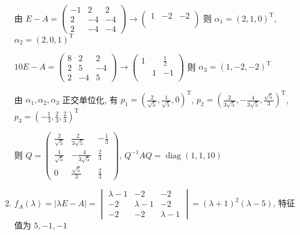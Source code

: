 \begin{enumerate}
			       由 \( E-A = \begin{pmatrix}
				       -1 & 2  & 2  \\
				       2  & -4 & -4 \\
				       2  & -4 & -4
			       \end{pmatrix} \rightarrow \begin{pmatrix}
				       1 & -2 & -2 \\
				         &    &    \\
				         &    &
			       \end{pmatrix} \) 则 \( \alpha_{1} = (2, 1, 0)^{\mathrm{T}} \), \( \alpha_{2} = (2, 0, 1)^{\mathrm{T}} \)

			       \( 10E-A = \begin{pmatrix}
				       8 & 2  & 2  \\
				       2 & 5  & -4 \\
				       2 & -4 & 5
			       \end{pmatrix} \rightarrow \begin{pmatrix}
				       1 &   & \frac{1}{2} \\
				         & 1 & -1          \\
				         &   &
			       \end{pmatrix} \) 则 \( \alpha_{3} = (1, -2, -2)^{\mathrm{T}} \)

			       由 \( \alpha_{1}, \alpha_{2}, \alpha_{3} \) 正交单位化, 有 \( p_{1} = \left( \frac{2}{\sqrt{5}}, \frac{1}{\sqrt{5}}, 0 \right)^{\mathrm{T}} \), \( p_{2} = \left( \frac{2}{3\sqrt{5}}, -\frac{4}{3\sqrt{5}}, \frac{\sqrt{5}}{3} \right)^{\mathrm{T}} \), \( p_{3} = \left( -\frac{1}{3}, \frac{2}{3}, \frac{2}{3} \right)^{\mathrm{T}} \)

			       则 \( Q = \begin{pmatrix}
				       \frac{2}{\sqrt{5}} & \frac{2}{3\sqrt{5}}  & -\frac{1}{3} \\
				       \frac{1}{\sqrt{5}} & -\frac{4}{3\sqrt{5}} & \frac{2}{3}  \\
				       0                  & \frac{\sqrt{5}}{3}   & \frac{2}{3}
			       \end{pmatrix} \), \( Q^{-1}AQ = \operatorname{diag}(1, 1, 10) \)
			 \item %
			       \( f_{A}(\lambda) = |\lambda E - A| = \begin{vmatrix}
				       \lambda-1 & -2        & -2        \\
				       -2        & \lambda-1 & -2        \\
				       -2        & -2        & \lambda-1
			       \end{vmatrix} = (\lambda+1)^{2}(\lambda-5) \), 特征值为 \( 5, -1, -1 \)


\end{enumerate}
